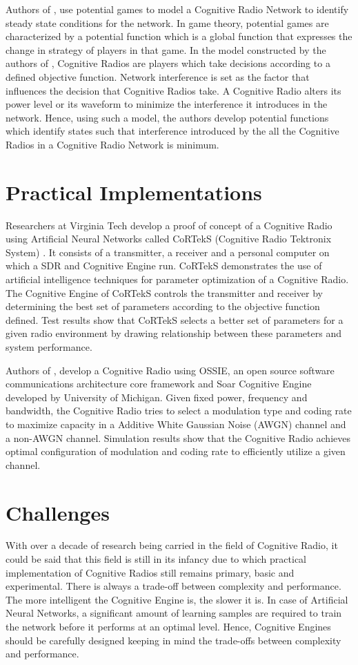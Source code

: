 \documentclass[conference]{IEEEtran}
\begin{document}
    Authors of \cite{22}, use potential games to model a Cognitive Radio Network to identify steady state conditions for the network. In game theory, potential games are characterized by a potential function which is a global function that expresses the change in strategy of players in that game. In the model constructed by the authors of \cite{22}, Cognitive Radios are players which take decisions according to a defined objective function. Network interference is set as the factor that influences the decision that Cognitive Radios take. A Cognitive Radio alters its power level or its waveform to minimize the interference it introduces in the network. Hence, using such a model, the authors develop potential functions which identify states such that interference introduced by the all the Cognitive Radios in a Cognitive Radio Network is minimum. 
	

\section{Practical Implementations}
	Researchers at Virginia Tech develop a proof of concept of a Cognitive Radio using Artificial Neural Networks called CoRTekS (Cognitive Radio Tektronix System) \cite{3}. It consists of a transmitter, a receiver and a personal computer on which a SDR and Cognitive Engine run. CoRTekS demonstrates the use of artificial intelligence techniques for parameter optimization of a Cognitive Radio. The Cognitive Engine of CoRTekS controls the transmitter and receiver by determining the best set of parameters according to the objective function defined. Test results show that CoRTekS selects a better set of parameters for a given radio environment by drawing relationship between these parameters and system performance. 

    Authors of \cite{4}, develop a Cognitive Radio using OSSIE, an open source software communications architecture core framework and Soar Cognitive Engine developed by University of Michigan. Given fixed power, frequency and bandwidth, the Cognitive Radio tries to select a modulation type and coding rate to maximize capacity in a Additive White Gaussian Noise (AWGN) channel and a non-AWGN channel. Simulation results show that the Cognitive Radio achieves optimal configuration of modulation and coding rate to efficiently utilize a given channel. 

\section{Challenges}
	With over a decade of research being carried in the field of Cognitive Radio, it could be said that this field is still in its infancy due to which practical implementation of Cognitive Radios still remains primary, basic and experimental. There is always a trade-off between complexity and performance. The more intelligent the Cognitive Engine is, the slower it is. In case of Artificial Neural Networks, a significant amount of learning samples are required to train the network before it performs at an optimal level. Hence, Cognitive Engines should be carefully designed keeping in mind the trade-offs between complexity and performance.
	
\end{document}
